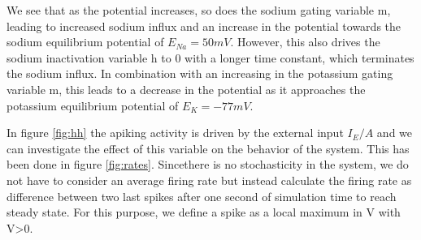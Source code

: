 \documentclass{article}
\begin{document}
We see that as the potential increases, so does the sodium gating variable m, leading to increased sodium influx and an increase in the potential towards the sodium equilibrium potential of $E_{Na} = 50 mV$. However, this also drives the sodium inactivation variable h to 0 with a longer time constant, which terminates the sodium influx. In combination with an increasing in the potassium gating variable m, this leads to a decrease in the potential as it approaches the potassium equilibrium potential of $E_K = -77 mV$.

In figure \ref{fig:hh} the apiking activity is driven by the external input $I_E/A$ and we can investigate the effect of this variable on the behavior of the system. This has been done in figure \ref{fig:rates}. Sincethere is no stochasticity in the system, we do not have to consider an average firing rate but instead calculate the firing rate as difference between two last spikes after one second of simulation time to reach steady state. For this purpose, we define a spike as a local maximum in V with V>0.
\end{document}
